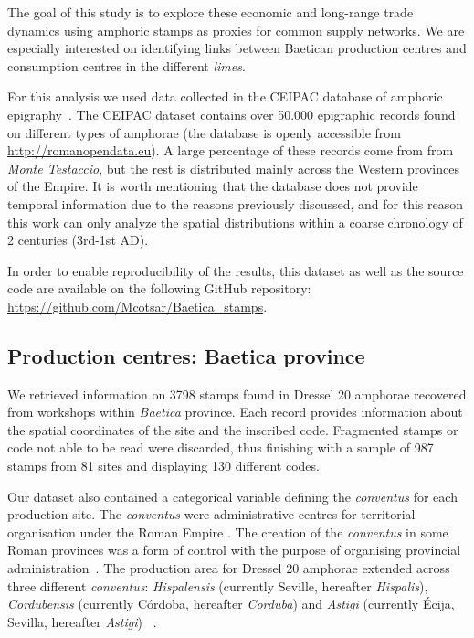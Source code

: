 The goal of this study is to explore these economic and long-range trade dynamics using amphoric stamps as proxies for common supply networks. We are especially interested on identifying links between Baetican production centres and consumption centres in the different \textit{limes}. 

For this analysis we used data collected in the CEIPAC database of amphoric epigraphy~\citep{remesal_centro_2015}. The CEIPAC dataset contains over 50.000 epigraphic records found on different types of amphorae (the database is openly accessible from \url{http://romanopendata.eu}). A large percentage of these records come from from \textit{Monte Testaccio}, but the rest is distributed mainly across the Western provinces of the Empire. It is worth mentioning that the database does not provide temporal information due to the reasons previously discussed, and for this reason this work can only analyze the spatial distributions within a coarse chronology of 2 centuries (3rd-1st AD).

In order to enable reproducibility of the results, this dataset as well as the source code are available on the following GitHub repository: \url{https://github.com/Mcotsar/Baetica\_stamps}.

\subsection{Production centres: Baetica province}
\label{sec:5}

We retrieved information on 3798 stamps found in Dressel 20 amphorae recovered from workshops within \textit{Baetica} province. Each record provides information about the spatial coordinates of the site and the inscribed code. Fragmented stamps or code not able to be read were discarded, thus finishing with a sample of 987 stamps from 81 sites and displaying 130 different codes.

Our dataset also contained a categorical variable defining the \textit{conventus} for each production site. The \textit{conventus} were administrative centres for territorial organisation under the Roman Empire \citep[58]{ozcariz_gil_administracion_2013}. The creation of the \textit{conventus} in some Roman provinces was a form of control with the purpose of organising provincial administration~\citep{albertini_les_1923}. The production area for Dressel 20 amphorae extended across three different \textit{conventus}: \textit{Hispalensis} (currently Seville, hereafter \textit{Hispalis}), \textit{Cordubensis} (currently C\'ordoba, hereafter \textit{Corduba}) and \textit{Astigi} (currently \'Ecija, Sevilla, hereafter \textit{Astigi})~\citep{rodriguez_economioleicola_1977,chicdatos2001,berni_millet_epigrafianforica_2008} . 

